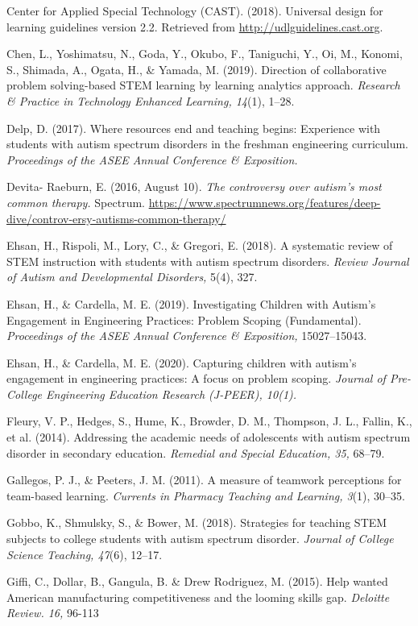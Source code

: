 \documentclass[11.5pt]{sig-alternate}
\begin{document}
Center for Applied Special Technology (CAST). (2018). Universal design for learning guidelines version 2.2. Retrieved from \url{http://udlguidelines.cast.org}. 

Chen, L., Yoshimatsu, N., Goda, Y., Okubo, F., Taniguchi, Y., Oi, M., Konomi, S., Shimada, A., Ogata, H., \& Yamada, M. (2019). Direction of collaborative problem solving-based STEM learning by learning analytics approach. \textit{Research \& Practice in Technology Enhanced Learning, 14}(1), 1–28. 

Delp, D. (2017). Where resources end and teaching begins: Experience with students with autism spectrum disorders in the freshman engineering curriculum. \textit{Proceedings of the ASEE Annual Conference \& Exposition.}

Devita- Raeburn, E. (2016, August 10). \textit{The controversy over autism’s most common therapy.} Spectrum. \url{https://www.spectrumnews.org/features/deep-dive/controv-ersy-autisms-common-therapy/}

Ehsan, H., Rispoli, M., Lory, C., \& Gregori, E. (2018). A systematic review of STEM instruction with students with autism spectrum disorders. \textit{Review Journal of Autism and Developmental Disorders,} 5(4), 327. 

Ehsan, H., \& Cardella, M. E. (2019). Investigating Children with Autism’s Engagement in Engineering Practices: Problem Scoping (Fundamental). \textit{Proceedings of the ASEE Annual Conference \& Exposition,} 15027–15043. 

Ehsan, H., \& Cardella, M. E. (2020). Capturing children with autism’s engagement in engineering practices: A focus on problem scoping. \textit{Journal of Pre-College Engineering Education Research (J-PEER), 10(1).} 

Fleury, V. P., Hedges, S., Hume, K., Browder, D. M., Thompson, J. L., Fallin, K., et al. (2014). Addressing the academic needs of adolescents with autism spectrum disorder in secondary education. \textit{Remedial and Special Education, 35,} 68–79. 

Gallegos, P. J., \& Peeters, J. M. (2011). A measure of teamwork perceptions for team-based learning. \textit{Currents in Pharmacy Teaching and Learning, 3}(1), 30–35.

Gobbo, K., Shmulsky, S., \& Bower, M. (2018). Strategies for teaching STEM subjects to college students with autism spectrum disorder. \textit{Journal of College Science Teaching, 47}(6), 12–17.

Giffi, C., Dollar, B., Gangula, B. \& Drew Rodriguez, M. (2015). Help wanted American manufacturing competitiveness and the looming skills gap. \textit{Deloitte Review. 16,} 96-113
\end{document}
